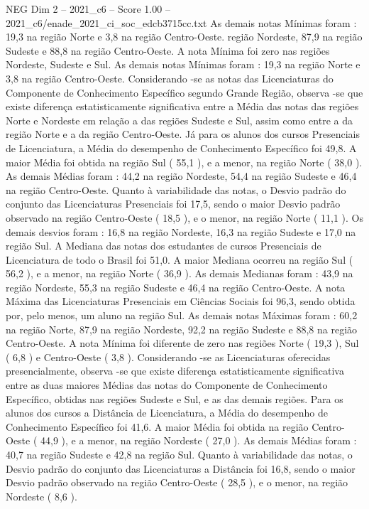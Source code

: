 \begin{textsample}{NEG Dim 2 – 2021\_c6 – Score 1.00 – 2021\_c6/enade\_2021\_ci\_soc\_edcb3715cc.txt}
As demais notas Mínimas foram : 19,3 na região Norte e 3,8 na região Centro-Oeste. região Nordeste, 87,9 na região Sudeste e 88,8 na região Centro-Oeste.
A nota Mínima foi zero nas regiões Nordeste, Sudeste e Sul.
As demais notas Mínimas foram : 19,3 na região Norte e 3,8 na região Centro-Oeste.
Considerando -se as notas das Licenciaturas do Componente de Conhecimento Específico segundo Grande Região, observa -se que existe diferença estatisticamente significativa entre a Média das notas das regiões Norte e Nordeste em relação a das regiões Sudeste e Sul, assim como entre a da região Norte e a da região Centro-Oeste.
Já para os alunos dos cursos Presenciais de Licenciatura, a Média do desempenho de Conhecimento Específico foi 49,8.
A maior Média foi obtida na região Sul ( 55,1 ), e a menor, na região Norte ( 38,0 ).
As demais Médias foram : 44,2 na região Nordeste, 54,4 na região Sudeste e 46,4 na região Centro-Oeste.
Quanto à variabilidade das notas, o Desvio padrão do conjunto das Licenciaturas Presenciais foi 17,5, sendo o maior Desvio padrão observado na região Centro-Oeste ( 18,5 ), e o menor, na região Norte ( 11,1 ).
Os demais desvios foram : 16,8 na região Nordeste, 16,3 na região Sudeste e 17,0 na região Sul.
A Mediana das notas dos estudantes de cursos Presenciais de Licenciatura de todo o Brasil foi 51,0.
A maior Mediana ocorreu na região Sul ( 56,2 ), e a menor, na região Norte ( 36,9 ).
As demais Medianas foram : 43,9 na região Nordeste, 55,3 na região Sudeste e 46,4 na região Centro-Oeste.
A nota Máxima das Licenciaturas Presenciais em Ciências Sociais foi 96,3, sendo obtida por, pelo menos, um aluno na região Sul.
As demais notas Máximas foram : 60,2 na região Norte, 87,9 na região Nordeste, 92,2 na região Sudeste e 88,8 na região Centro-Oeste.
A nota Mínima foi diferente de zero nas regiões Norte ( 19,3 ), Sul ( 6,8 ) e Centro-Oeste ( 3,8 ).
Considerando -se as Licenciaturas oferecidas presencialmente, observa -se que existe diferença estatisticamente significativa entre as duas maiores Médias das notas do Componente de Conhecimento Específico, obtidas nas regiões Sudeste e Sul, e as das demais regiões.
Para os alunos dos cursos a Distância de Licenciatura, a Média do desempenho de Conhecimento Específico foi 41,6.
A maior Média foi obtida na região Centro-Oeste ( 44,9 ), e a menor, na região Nordeste ( 27,0 ).
As demais Médias foram : 40,7 na região Sudeste e 42,8 na região Sul.
Quanto à variabilidade das notas, o Desvio padrão do conjunto das Licenciaturas a Distância foi 16,8, sendo o maior Desvio padrão observado na região Centro-Oeste ( 28,5 ), e o menor, na região Nordeste ( 8,6 ).

\end{textsample}

